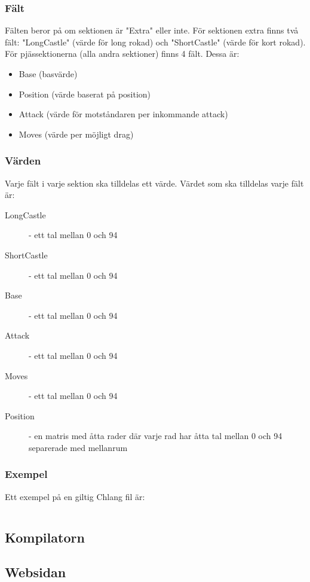 \documentclass{article}
\begin{document}
	\subsubsection{Fält}
	Fälten beror på om sektionen är "Extra" eller inte.
	För sektionen extra finns två fält: "LongCastle" (värde för long rokad) och "ShortCastle" (värde för kort rokad). För pjässektionerna (alla andra sektioner) finns 4 fält. Dessa är:
\begin{itemize}
\item Base (basvärde)
\item Position (värde baserat på position)
\item Attack (värde för motståndaren per inkommande attack)
\item Moves (värde per möjligt drag)
\end{itemize}

\subsubsection{Värden}
Varje fält i varje sektion ska tilldelas ett värde. Värdet som ska tilldelas varje fält är:
\begin{description}
\item [LongCastle] - ett tal mellan 0 och 94
\item [ShortCastle] - ett tal mellan 0 och 94
\item [Base] - ett tal mellan 0 och 94
\item [Attack] - ett tal mellan 0 och 94 
\item [Moves] - ett tal mellan 0 och 94
\item [Position] - en matris med åtta rader där varje rad har åtta tal mellan 0 och 94 separerade med mellanrum
\end{description}

\subsubsection{Exempel}
Ett exempel på en giltig Chlang fil är:
\begin{lstlisting} 

\end{lstlisting}


	
	\subsection{Kompilatorn}
	\subsection{Websidan}
\end{document}
